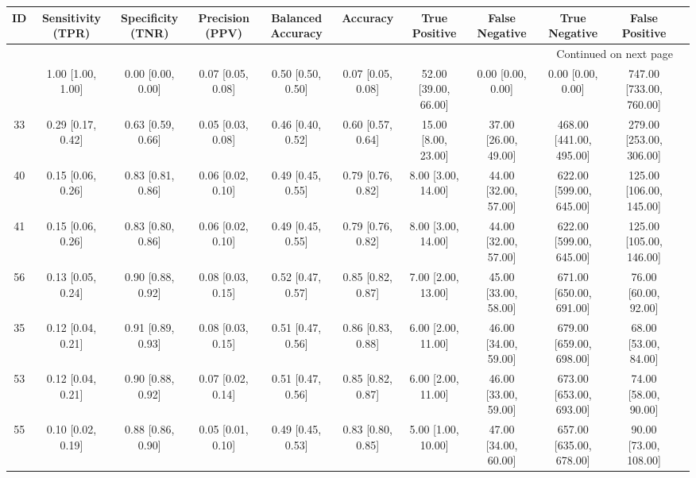 \documentclass[8pt]{article}
\begin{document}
\begin{center}
\begin{footnotesize}
\begin{longtable}{|ccccccccccc|}
\toprule
 ID &  Sensitivity (TPR) &  Specificity (TNR) &    Precision (PPV) &  Balanced Accuracy &           Accuracy &         True Positive &        False Negative &            True Negative &           False Positive \\
\midrule
\endhead
\midrule
\multicolumn{10}{r}{{Continued on next page}} \\
\midrule
\endfoot

\bottomrule
\endlastfoot
 42 &  1.00 [1.00, 1.00] &  0.00 [0.00, 0.00] &  0.07 [0.05, 0.08] &  0.50 [0.50, 0.50] &  0.07 [0.05, 0.08] &  52.00 [39.00, 66.00] &     0.00 [0.00, 0.00] &        0.00 [0.00, 0.00] &  747.00 [733.00, 760.00] \\
 33 &  0.29 [0.17, 0.42] &  0.63 [0.59, 0.66] &  0.05 [0.03, 0.08] &  0.46 [0.40, 0.52] &  0.60 [0.57, 0.64] &   15.00 [8.00, 23.00] &  37.00 [26.00, 49.00] &  468.00 [441.00, 495.00] &  279.00 [253.00, 306.00] \\
 40 &  0.15 [0.06, 0.26] &  0.83 [0.81, 0.86] &  0.06 [0.02, 0.10] &  0.49 [0.45, 0.55] &  0.79 [0.76, 0.82] &    8.00 [3.00, 14.00] &  44.00 [32.00, 57.00] &  622.00 [599.00, 645.00] &  125.00 [106.00, 145.00] \\
 41 &  0.15 [0.06, 0.26] &  0.83 [0.80, 0.86] &  0.06 [0.02, 0.10] &  0.49 [0.45, 0.55] &  0.79 [0.76, 0.82] &    8.00 [3.00, 14.00] &  44.00 [32.00, 57.00] &  622.00 [599.00, 645.00] &  125.00 [105.00, 146.00] \\
 56 &  0.13 [0.05, 0.24] &  0.90 [0.88, 0.92] &  0.08 [0.03, 0.15] &  0.52 [0.47, 0.57] &  0.85 [0.82, 0.87] &    7.00 [2.00, 13.00] &  45.00 [33.00, 58.00] &  671.00 [650.00, 691.00] &     76.00 [60.00, 92.00] \\
 35 &  0.12 [0.04, 0.21] &  0.91 [0.89, 0.93] &  0.08 [0.03, 0.15] &  0.51 [0.47, 0.56] &  0.86 [0.83, 0.88] &    6.00 [2.00, 11.00] &  46.00 [34.00, 59.00] &  679.00 [659.00, 698.00] &     68.00 [53.00, 84.00] \\
 53 &  0.12 [0.04, 0.21] &  0.90 [0.88, 0.92] &  0.07 [0.02, 0.14] &  0.51 [0.47, 0.56] &  0.85 [0.82, 0.87] &    6.00 [2.00, 11.00] &  46.00 [33.00, 59.00] &  673.00 [653.00, 693.00] &     74.00 [58.00, 90.00] \\
 55 &  0.10 [0.02, 0.19] &  0.88 [0.86, 0.90] &  0.05 [0.01, 0.10] &  0.49 [0.45, 0.53] &  0.83 [0.80, 0.85] &    5.00 [1.00, 10.00] &  47.00 [34.00, 60.00] &  657.00 [635.00, 678.00] &    90.00 [73.00, 108.00] \\

\end{longtable}
\end{footnotesize}
\end{center}
\end{document}
